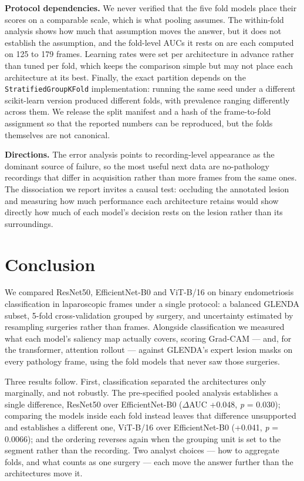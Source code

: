 \documentclass[preprint,12pt]{elsarticle}
\begin{document}
\textbf{Protocol dependencies.} We never verified that the five fold models place their scores on a comparable scale, which is what pooling assumes. The within-fold analysis shows how much that assumption moves the answer, but it does not establish the assumption, and the fold-level AUCs it rests on are each computed on 125 to 179 frames. Learning rates were set per architecture in advance rather than tuned per fold, which keeps the comparison simple but may not place each architecture at its best. Finally, the exact partition depends on the \texttt{StratifiedGroupKFold} implementation: running the same seed under a different scikit-learn version produced different folds, with prevalence ranging differently across them. We release the split manifest and a hash of the frame-to-fold assignment so that the reported numbers can be reproduced, but the folds themselves are not canonical.

\textbf{Directions.} The error analysis points to recording-level appearance as the dominant source of failure, so the most useful next data are no-pathology recordings that differ in acquisition rather than more frames from the same ones. The dissociation we report invites a causal test: occluding the annotated lesion and measuring how much performance each architecture retains would show directly how much of each model's decision rests on the lesion rather than its surroundings.

\section{Conclusion}
\label{sec:conclusion}

We compared ResNet50, EfficientNet-B0 and ViT-B/16 on binary endometriosis classification in laparoscopic frames under a single protocol: a balanced GLENDA subset, 5-fold cross-validation grouped by surgery, and uncertainty estimated by resampling surgeries rather than frames. Alongside classification we measured what each model's saliency map actually covers, scoring Grad-CAM --- and, for the transformer, attention rollout --- against GLENDA's expert lesion masks on every pathology frame, using the fold models that never saw those surgeries.

Three results follow. First, classification separated the architectures only marginally, and not robustly. The pre-specified pooled analysis establishes a single difference, ResNet50 over EfficientNet-B0 ($\Delta$AUC +0.048, \emph{p} = 0.030); comparing the models inside each fold instead leaves that difference unsupported and establishes a different one, ViT-B/16 over EfficientNet-B0 (+0.041, \emph{p} = 0.0066); and the ordering reverses again when the grouping unit is set to the segment rather than the recording. Two analyst choices --- how to aggregate folds, and what counts as one surgery --- each move the answer further than the architectures move it.
\end{document}
